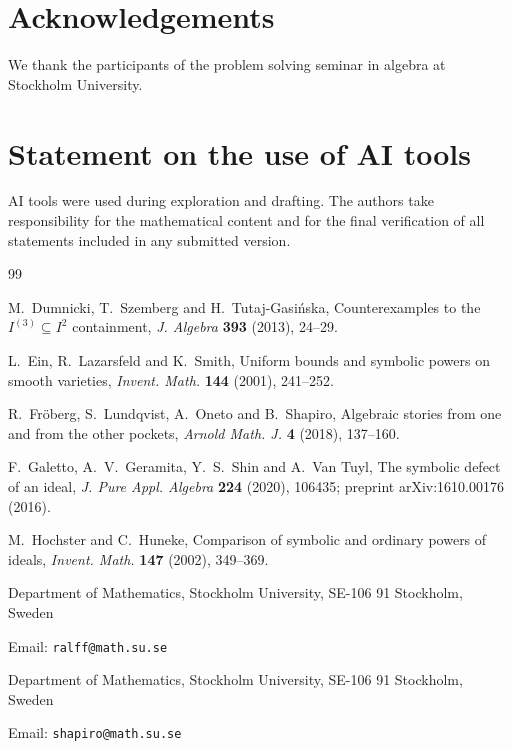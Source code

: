 \documentclass[11pt]{article}
\begin{document}
\section*{Acknowledgements}
We thank the participants of the problem solving seminar in algebra at
Stockholm University.

\section*{Statement on the use of AI tools}
AI tools were used during exploration and drafting.  The authors take
responsibility for the mathematical content and for the final
verification of all statements included in any submitted version.

\begin{thebibliography}{99}

M.~Dumnicki, T.~Szemberg and H.~Tutaj-Gasi\'nska,
\newblock Counterexamples to the \(I^{(3)}\subseteq I^2\) containment,
\newblock \emph{J. Algebra} \textbf{393} (2013), 24--29.

L.~Ein, R.~Lazarsfeld and K.~Smith,
\newblock Uniform bounds and symbolic powers on smooth varieties,
\newblock \emph{Invent. Math.} \textbf{144} (2001), 241--252.

R.~Fr\"oberg, S.~Lundqvist, A.~Oneto and B.~Shapiro,
\newblock Algebraic stories from one and from the other pockets,
\newblock \emph{Arnold Math. J.} \textbf{4} (2018), 137--160.

F.~Galetto, A.~V.~Geramita, Y.~S.~Shin and A.~Van Tuyl,
\newblock The symbolic defect of an ideal,
\newblock \emph{J. Pure Appl. Algebra} \textbf{224} (2020), 106435;
preprint arXiv:1610.00176 (2016).

M.~Hochster and C.~Huneke,
\newblock Comparison of symbolic and ordinary powers of ideals,
\newblock \emph{Invent. Math.} \textbf{147} (2002), 349--369.

\end{thebibliography}

\bigskip
\noindent
Department of Mathematics, Stockholm University,
SE-106 91 Stockholm, Sweden

\noindent
Email: \texttt{ralff@math.su.se}

\medskip
\noindent
Department of Mathematics, Stockholm University,
SE-106 91 Stockholm, Sweden

\noindent
Email: \texttt{shapiro@math.su.se}
\end{document}
